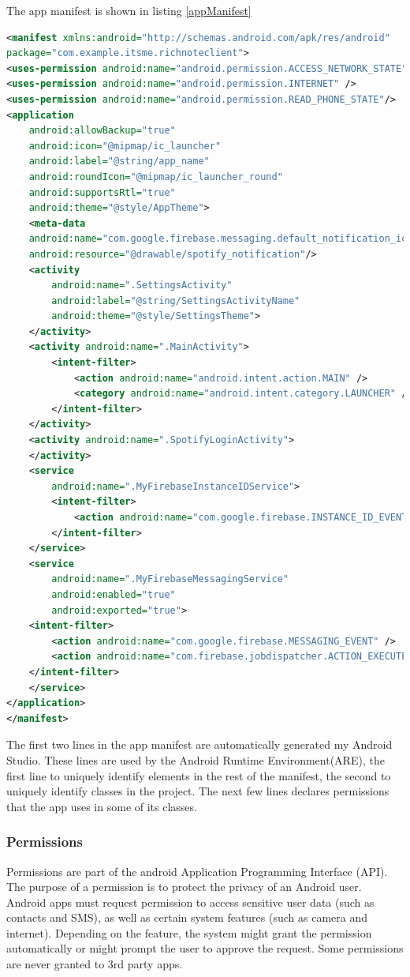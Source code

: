 The app manifest is shown in listing \ref{appManifest}
\clearpage
\begin{lstlisting}[language=XML, caption={app manifest},label={appManifest}]
<manifest xmlns:android="http://schemas.android.com/apk/res/android"
package="com.example.itsme.richnoteclient">
<uses-permission android:name="android.permission.ACCESS_NETWORK_STATE" />
<uses-permission android:name="android.permission.INTERNET" />
<uses-permission android:name="android.permission.READ_PHONE_STATE"/>
<application
    android:allowBackup="true"
    android:icon="@mipmap/ic_launcher"
    android:label="@string/app_name"
    android:roundIcon="@mipmap/ic_launcher_round"
    android:supportsRtl="true"
    android:theme="@style/AppTheme">
    <meta-data
    android:name="com.google.firebase.messaging.default_notification_icon"
    android:resource="@drawable/spotify_notification"/>
    <activity
        android:name=".SettingsActivity"
        android:label="@string/SettingsActivityName"
        android:theme="@style/SettingsTheme">
    </activity>
    <activity android:name=".MainActivity">
        <intent-filter>
            <action android:name="android.intent.action.MAIN" />
            <category android:name="android.intent.category.LAUNCHER" />
        </intent-filter>
    </activity>
    <activity android:name=".SpotifyLoginActivity">
    </activity>
    <service
        android:name=".MyFirebaseInstanceIDService">
        <intent-filter>
            <action android:name="com.google.firebase.INSTANCE_ID_EVENT"/>
        </intent-filter>
    </service>
    <service
        android:name=".MyFirebaseMessagingService"
        android:enabled="true"
        android:exported="true">
    <intent-filter>
        <action android:name="com.google.firebase.MESSAGING_EVENT" />
        <action android:name="com.firebase.jobdispatcher.ACTION_EXECUTE" />
    </intent-filter>
    </service>
</application>
</manifest>
\end{lstlisting}

The first two lines in the app manifest are automatically generated my Android Studio. These lines are used by the Android Runtime Environment(ARE), the first line to uniquely identify elements in the rest of the manifest, the second to uniquely identify classes in the project. The next few lines declares permissions that the app uses in some of its classes.

\subsubsection{Permissions \cite{permissions}}{
Permissions are part of the android Application Programming Interface (API). The purpose of a permission is to protect the privacy of an Android user. Android apps must request permission to access sensitive user data (such as contacts and SMS), as well as certain system features (such as camera and internet). Depending on the feature, the system might grant the permission automatically or might prompt the user to approve the request. Some permissions are never granted to 3rd party apps.}

